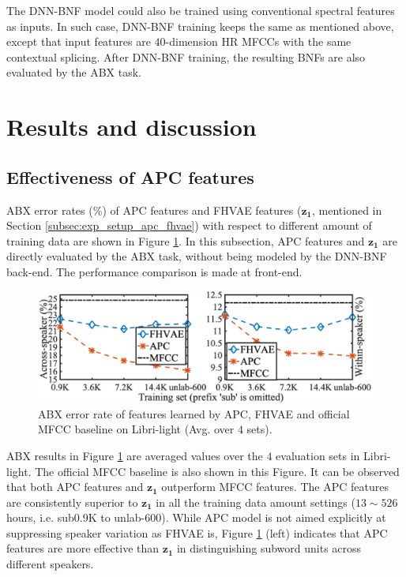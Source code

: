 \documentclass[a4paper]{article}
\begin{document}
The DNN-BNF model could also be trained using conventional spectral features as inputs. 
In such case, DNN-BNF training keeps the same as mentioned above, except that input features are $40$-dimension HR MFCCs with the same contextual splicing. After DNN-BNF training, the resulting BNFs are also evaluated by the ABX task.

\section{Results and discussion}
\subsection{Effectiveness of APC features }

ABX error rates ($\%$) of  APC features  and FHVAE features ($\bm{z_1}$, mentioned in Section \ref{subsec:exp_setup_apc_fhvae}) with respect to different amount of training data are shown in Figure \ref{fig:apc_fhvae_mfcc}.
{\color{blue}
In this subsection, APC  features and $\bm{z_1}$ are directly evaluated by the ABX task, without being modeled by the  DNN-BNF back-end. The performance comparison is made at front-end.}
\begin{figure}[!t]
    \centering
    \includegraphics[width=.9\linewidth]{LaTeX/apc_fhvae_mfcc_no_sub.png}
    \caption{ABX error rate  of features learned by APC, FHVAE and official MFCC baseline on Libri-light (Avg. over $4$ sets). }
    \label{fig:apc_fhvae_mfcc}
\end{figure}
ABX results in  Figure \ref{fig:apc_fhvae_mfcc} are averaged values over the $4$ evaluation sets in Libri-light. The official MFCC baseline   \cite{kahn2019librilight} is also shown in this Figure. It can be observed that both APC features and $\bm{z_1}$  outperform MFCC features. The APC features are consistently superior to $\bm{z_1}$ in all the training data amount settings ($13 \sim 526$ hours, i.e. sub0.9K to unlab-600). 
While APC model is not aimed explicitly at suppressing speaker variation as FHVAE is,   
Figure \ref{fig:apc_fhvae_mfcc} (left) indicates that APC features are more effective than   $\bm{z_1}$ in distinguishing subword units across different speakers.
\end{document}
